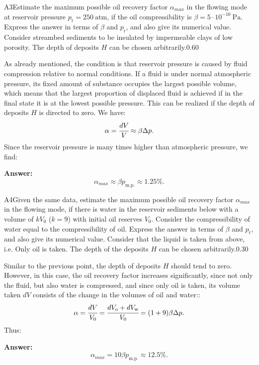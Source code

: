 \documentclass[11pt,a4paper]{article}
\begin{document}
\begin{solcard}{A3}{Estimate the maximum possible oil recovery factor $\alpha_{max}$ in the flowing mode at reservoir pressure $p_\text{r}=250~\text{atm}$, if the oil compressibility is $\beta = 5\cdot 10^{-10}~\text{Pa}$. Express the answer in terms of $\beta$ and $p_\text{r}$, and also give its numerical value. Consider streambed sediments to be insulated by impermeable clays of low porosity. The depth of deposits $H$ can be chosen arbitrarily.}{0.60}

As already mentioned, the condition is that reservoir pressure is caused by fluid compression relative to normal conditions. If a fluid is under normal atmospheric pressure, its fixed amount of substance occupies the largest possible volume, which means that the largest proportion of displaced fluid is achieved if in the final state it is at the lowest possible pressure. This can be realized if the depth of deposits $H$ is directed to zero. We have: $$\alpha=\cfrac{dV}{V}\approx \beta\Delta{p}{.} $$Since the reservoir pressure is many times higher than atmospheric pressure, we find:

\par\smallskip\noindent\textbf{Answer:} $$\alpha_{max}\approx \beta p_{\text{m.p.}}\approx 1{.}25\text{\%}{.} $$
\end{solcard}

\begin{solcard}{A4}{Given the same data, estimate the maximum possible oil recovery factor $\alpha_{max}$ in the flowing mode, if there is water in the reservoir sediments below with a volume of $kV_0$ ($k = 9$) with initial oil reserves $V_0$. Consider the compressibility of water equal to the compressibility of oil. Express the answer in terms of $\beta$ and $p_\text{r}$, and also give its numerical value. Consider that the liquid is taken from above, i.e. Only oil is taken. The depth of the deposits $H$ can be chosen arbitrarily.}{0.30}

Similar to the previous point, the depth of deposits $H$ should tend to zero. However, in this case, the oil recovery factor increases significantly, since not only the fluid, but also water is compressed, and since only oil is taken, its volume taken $dV$ consists of the change in the volumes of oil and water:: $$\alpha=\cfrac{dV}{V_0}=\cfrac{dV_\text{o}+dV_\text{w}}{V_0}=(1+9)\beta\Delta{p}{.} $$Thus:

\par\smallskip\noindent\textbf{Answer:} $$\alpha_{max}=10\beta p_{\text{m.p.}}\approx 12{.}5\text{\%}{.} $$
\end{solcard}
\end{document}
